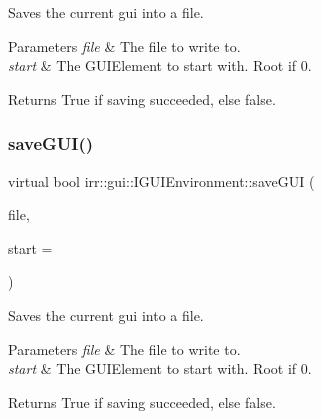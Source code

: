Saves the current gui into a file. 


\begin{DoxyParams}{Parameters}
{\em file} & The file to write to. \\
\hline
{\em start} & The G\+U\+I\+Element to start with. Root if 0. \\
\hline
\end{DoxyParams}
\begin{DoxyReturn}{Returns}
True if saving succeeded, else false. 
\end{DoxyReturn}
\mbox{\label{classirr_1_1gui_1_1IGUIEnvironment_a39fdeef8455813a2be2bce9212ec758a}} 
\subsubsection{\texorpdfstring{save\+G\+U\+I()}{saveGUI()}\hspace{0.1cm}{\footnotesize\ttfamily [4/4]}}
{\footnotesize\ttfamily virtual bool irr\+::gui\+::\+I\+G\+U\+I\+Environment\+::save\+G\+UI (\begin{DoxyParamCaption}\item[{\hyperlink{classirr_1_1io_1_1IWriteFile}{io\+::\+I\+Write\+File} $\ast$}]{file,  }\item[{\hyperlink{classirr_1_1gui_1_1IGUIElement}{I\+G\+U\+I\+Element} $\ast$}]{start = {} }\end{DoxyParamCaption})\hspace{0.3cm}{\ttfamily [pure virtual]}}



Saves the current gui into a file. 


\begin{DoxyParams}{Parameters}
{\em file} & The file to write to. \\
\hline
{\em start} & The G\+U\+I\+Element to start with. Root if 0. \\
\hline
\end{DoxyParams}
\begin{DoxyReturn}{Returns}
True if saving succeeded, else false. 
\end{DoxyReturn}
\mbox{\label{classirr_1_1gui_1_1IGUIEnvironment_a2bfe9985ae1a2f379e708fce86902cea}} 
